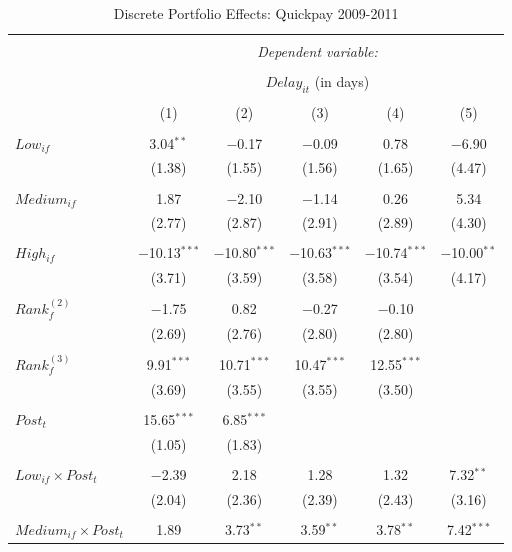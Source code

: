 \documentclass[
]{article}
\begin{document}
\begin{table}[H] \centering 
  \caption{Discrete Portfolio Effects: Quickpay 2009-2011} 
  \label{} 
\small 
\begin{tabular}{@{\extracolsep{-2pt}}lccccc} 
\\[-1.8ex]\hline 
\hline \\[-1.8ex] 
 & \multicolumn{5}{c}{\textit{Dependent variable:}} \\ 
\cline{2-6} 
\\[-1.8ex] & \multicolumn{5}{c}{$Delay_{it}$ (in days)} \\ 
\\[-1.8ex] & (1) & (2) & (3) & (4) & (5)\\ 
\hline \\[-1.8ex] 
 $Low_{if}$ & 3.04$^{**}$ & $-$0.17 & $-$0.09 & 0.78 & $-$6.90 \\ 
  & (1.38) & (1.55) & (1.56) & (1.65) & (4.47) \\ 
  & & & & & \\ 
 $Medium_{if}$ & 1.87 & $-$2.10 & $-$1.14 & 0.26 & 5.34 \\ 
  & (2.77) & (2.87) & (2.91) & (2.89) & (4.30) \\ 
  & & & & & \\ 
 $High_{if}$ & $-$10.13$^{***}$ & $-$10.80$^{***}$ & $-$10.63$^{***}$ & $-$10.74$^{***}$ & $-$10.00$^{**}$ \\ 
  & (3.71) & (3.59) & (3.58) & (3.54) & (4.17) \\ 
  & & & & & \\ 
 $Rank_f^{(2)}$ & $-$1.75 & 0.82 & $-$0.27 & $-$0.10 &  \\ 
  & (2.69) & (2.76) & (2.80) & (2.80) &  \\ 
  & & & & & \\ 
 $Rank_f^{(3)}$ & 9.91$^{***}$ & 10.71$^{***}$ & 10.47$^{***}$ & 12.55$^{***}$ &  \\ 
  & (3.69) & (3.55) & (3.55) & (3.50) &  \\ 
  & & & & & \\ 
 $Post_t$ & 15.65$^{***}$ & 6.85$^{***}$ &  &  &  \\ 
  & (1.05) & (1.83) &  &  &  \\ 
  & & & & & \\ 
 $Low_{if} \times Post_t$ & $-$2.39 & 2.18 & 1.28 & 1.32 & 7.32$^{**}$ \\ 
  & (2.04) & (2.36) & (2.39) & (2.43) & (3.16) \\ 
  & & & & & \\ 
 $Medium_{if} \times Post_t$ & 1.89 & 3.73$^{**}$ & 3.59$^{**}$ & 3.78$^{**}$ & 7.42$^{***}$ \\ 

\end{tabular}
\end{table}
\end{document}
